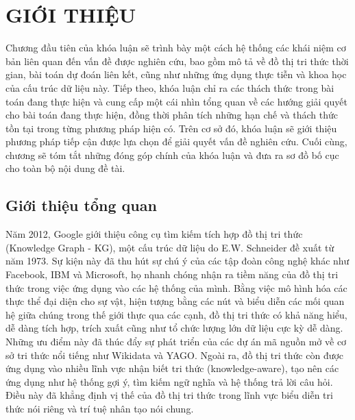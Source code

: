 \chapter{GIỚI THIỆU}
\label{Chapter1}

Chương đầu tiên của khóa luận sẽ trình bày một cách hệ thống các khái
niệm cơ bản liên quan đến vấn đề được nghiên cứu, bao gồm mô tả về đồ
thị tri thức thời gian, bài toán dự đoán liên kết, cũng như những ứng dụng thực tiễn và khoa học của cấu trúc dữ liệu này. Tiếp theo, khóa luận chỉ ra các thách thức trong bài toán đang thực hiện và cung cấp một cái nhìn tổng quan về các hướng giải quyết cho bài toán đang thực hiện, đồng thời phân tích những hạn chế và thách thức tồn tại trong từng phương pháp hiện có. Trên cơ sở đó, khóa luận sẽ giới thiệu phương pháp tiếp cận được lựa chọn để giải quyết vấn đề nghiên cứu. Cuối cùng, chương sẽ tóm tắt những đóng góp chính của khóa luận và đưa ra sơ đồ bố cục cho toàn bộ nội dung đề tài.


\section{Giới thiệu tổng quan}

Năm 2012, Google giới thiệu công cụ tìm kiếm tích hợp đồ thị tri thức (Knowledge Graph - KG)\cite{ref_article01}, một cấu trúc dữ liệu do E.W. Schneider đề xuất từ năm 1973. Sự kiện này đã thu hút sự chú ý của các tập đoàn công nghệ khác như Facebook, IBM và Microsoft, họ nhanh chóng nhận ra tiềm năng của đồ thị tri thức trong việc ứng dụng vào các hệ thống của mình. Bằng việc mô hình hóa các thực thể đại diện cho sự vật, hiện tượng bằng các nút và biểu diễn các mối quan hệ giữa chúng trong thế giới thực qua các cạnh, đồ thị tri thức có khả năng hiểu, dễ dàng tích hợp, trích xuất cũng như tổ chức lượng lớn dữ liệu cực kỳ dễ dàng. Những ưu điểm này đã thúc đẩy sự phát triển của các dự án mã nguồn mở về cơ sở tri thức nổi tiếng như Wikidata và YAGO. Ngoài ra, đồ thị tri thức còn được ứng dụng vào nhiều lĩnh vực nhận biết tri thức (knowledge-aware), tạo nên các ứng dụng như hệ thống gợi ý, tìm kiếm ngữ nghĩa và hệ thống trả lời câu hỏi. Điều này đã khẳng định vị thế của đồ thị tri thức trong lĩnh vực biểu diễn tri thức nói riêng và trí tuệ nhân tạo nói chung.

